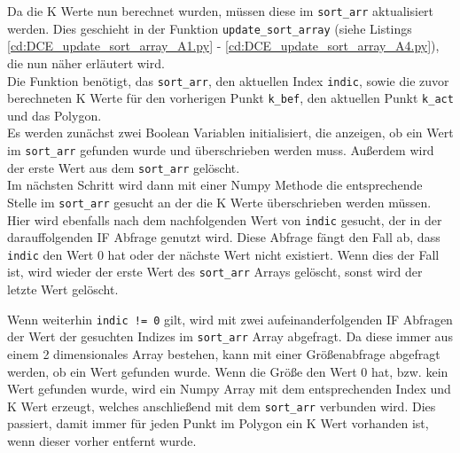 {	
	

	Da die K Werte nun berechnet wurden, müssen diese im \lstinline|sort_arr| aktualisiert werden. Dies geschieht in der Funktion \lstinline|update_sort_array| (siehe Listings \ref{cd:DCE_update_sort_array_A1.py} - \ref{cd:DCE_update_sort_array_A4.py}), die nun näher erläutert wird. \\
	Die Funktion benötigt, das \lstinline|sort_arr|, den aktuellen Index \lstinline|indic|, sowie die zuvor berechneten K Werte für den vorherigen Punkt \lstinline|k_bef|, den aktuellen Punkt \lstinline|k_act| und das Polygon. \\
	\newpage
	Es werden zunächst zwei Boolean Variablen initialisiert, die anzeigen, ob ein Wert im \lstinline|sort_arr| gefunden wurde und überschrieben werden muss. Außerdem wird der erste Wert aus dem \lstinline|sort_arr| gelöscht. \\
	Im nächsten Schritt wird dann mit einer Numpy Methode die entsprechende Stelle im \lstinline|sort_arr| gesucht an der die K Werte überschrieben werden müssen. Hier wird ebenfalls nach dem nachfolgenden Wert von \lstinline|indic| gesucht, der in der darauffolgenden IF Abfrage genutzt wird. Diese Abfrage fängt den Fall ab, dass \lstinline|indic| den Wert 0 hat oder der nächste Wert nicht existiert. Wenn dies der Fall ist, wird wieder der erste Wert des \lstinline|sort_arr| Arrays gelöscht, sonst wird der letzte Wert gelöscht.

	

	Wenn weiterhin \lstinline|indic != 0| gilt, wird mit zwei aufeinanderfolgenden IF Abfragen der Wert der gesuchten Indizes im \lstinline|sort_arr| Array abgefragt. Da diese immer aus einem 2 dimensionales Array bestehen, kann mit einer Größenabfrage abgefragt werden, ob ein Wert gefunden wurde. Wenn die Größe den Wert 0 hat, bzw. kein Wert gefunden wurde, wird ein Numpy Array mit dem entsprechenden Index und K Wert erzeugt, welches anschließend mit dem \lstinline|sort_arr| verbunden wird. Dies passiert, damit immer für jeden Punkt im Polygon ein K Wert vorhanden ist, wenn dieser vorher entfernt wurde.


}
